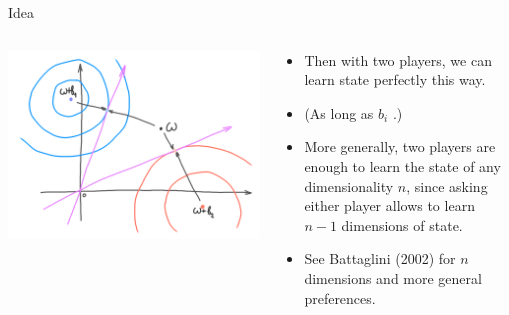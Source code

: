 \documentclass[english,10pt
,aspectratio=169
]{beamer}
\begin{document}
\begin{frame}{Idea}
	\begin{columns}
		\begin{column}{0.5\textwidth}
			\begin{center}
				\includegraphics[scale=0.65]{pics/M4/battaglini03.png}
			\end{center}
		\end{column}
		\begin{column}{0.5\textwidth}
			{\small
				\begin{itemize}
					\item Then with two players, we can learn state perfectly this way.
					\item (As long as $b_i$ .)
					\item More generally, two players are enough to learn the state of any dimensionality $n$, since asking either player allows to learn $n-1$ dimensions of state.
					\item See Battaglini (2002) for $n$ dimensions and more general preferences.
				\end{itemize}
			}
		\end{column}
	\end{columns}
\end{frame}
\end{document}
